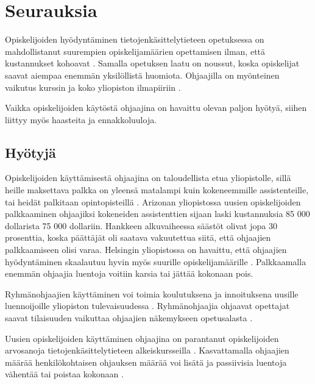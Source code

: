 \documentclass[finnish]{tktltiki2}
\theoremstyle{definition}
\theoremstyle{remark}
\begin{document}
\section{Seurauksia}

Opiskelijoiden hyödyntäminen tietojenkäsittelytieteen opetuksessa on mahdollistanut suurempien opiskelijamäärien opettamisen ilman, että kustannukset kohoavat \cite{Reges88}. Samalla opetuksen laatu on noussut, koska opiskelijat saavat aiempaa enemmän yksilöllistä huomiota. Ohjaajilla on myönteinen vaikutus kurssin ja koko yliopiston ilmapiiriin \cite{Dickson11,Roberts95, Tashakkori05}. \par

Vaikka opiskelijoiden käytöstä ohjaajina on havaittu olevan paljon hyötyä, siihen liittyy myös haasteita ja ennakkoluuloja.  \par

\subsection{Hyötyjä}

Opiskelijoiden käyttämisestä ohjaajina on taloudellista etua yliopistolle, sillä heille maksettava palkka on yleensä matalampi kuin kokeneemmille assistenteille, tai heidät palkitaan opintopisteillä \cite{Reges88}. Arizonan yliopistossa uusien opiskelijoiden palkkaaminen ohjaajiksi kokeneiden assistenttien sijaan laski kustannuksia 85 000 dollarista 75 000 dollariin. Hankkeen alkuvaiheessa säästöt olivat jopa 30 prosenttia, koska päättäjät oli saatava vakuutettua siitä, että ohjaajien palkkaamiseen olisi varaa. Helsingin yliopistossa on havaittu, että ohjaajien hyödyntäminen skaalautuu hyvin myös suurille opiskelijamäärille \cite{Kurhila11}. Palkkaamalla enemmän ohjaajia luentoja voitiin karsia tai jättää kokonaan pois. \par

Ryhmänohjaajien käyttäminen voi toimia koulutuksena ja innoituksena uusille luennoijoille yliopiston tulevaisuudessa \cite{Roberts95, Morgan02}. Ryhmänohjaajia ohjaavat opettajat saavat tilaisuuden vaikuttaa ohjaajien näkemykseen opetusalasta \cite{Morgan02}.  \par

Uusien opiskelijoiden käyttäminen ohjaajina on parantanut opiskelijoiden arvosanoja tietojenkäsittelytieteen alkeiskursseilla \cite{Decker06, Kurhila11}. Kasvattamalla ohjaajien määrää henkilökohtaisen ohjauksen määrää voi lisätä ja passiivisia luentoja vähentää tai poistaa kokonaan \cite{Kurhila11}. \par
\end{document}
